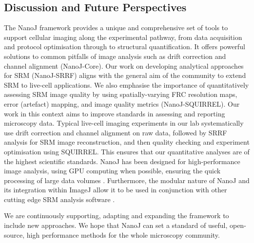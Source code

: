 \subsection*{Discussion and Future Perspectives}
 The NanoJ framework provides a unique and comprehensive set of tools to support cellular imaging along the experimental pathway, from data acquisition and protocol optimisation through to structural quantification. It offers powerful solutions to common pitfalls of image analysis such as drift correction and channel alignment (NanoJ-Core). Our work on developing analytical approaches for SRM (NanoJ-SRRF) aligns with the general aim of the community to extend SRM to live-cell applications. We also emphasise the importance of quantitatively assessing SRM image quality by using spatially-varying FRC resolution maps, error (artefact) mapping, and image quality metrics (NanoJ-SQUIRREL). Our work in this context aims to improve standards in assessing and reporting microscopy data. Typical live-cell imaging experiments in our lab systematically use drift correction and channel alignment on raw data, followed by SRRF analysis for SRM image reconstruction, and then quality checking and experiment optimisation using SQUIRREL. This ensures that our quantitative analyses are of the highest scientific standards. NanoJ has been designed for high-performance image analysis, using GPU computing when possible, ensuring the quick processing of large data volumes \cite{herbert2012single,pereira2015high,almada2015palm,beghin2017localization,douglass2016super}. Furthermore, the modular nature of NanoJ and its integration within ImageJ allow it to be used in conjunction with other cutting edge SRM analysis software \cite{sage2018super,weigert2017content,henriques2010quickpalm, laine2018milesim}. 
 
 We are continuously supporting, adapting and expanding the framework to include new approaches. We hope that NanoJ can set a standard of useful, open-source, high performance methods for the whole microscopy community.
 
